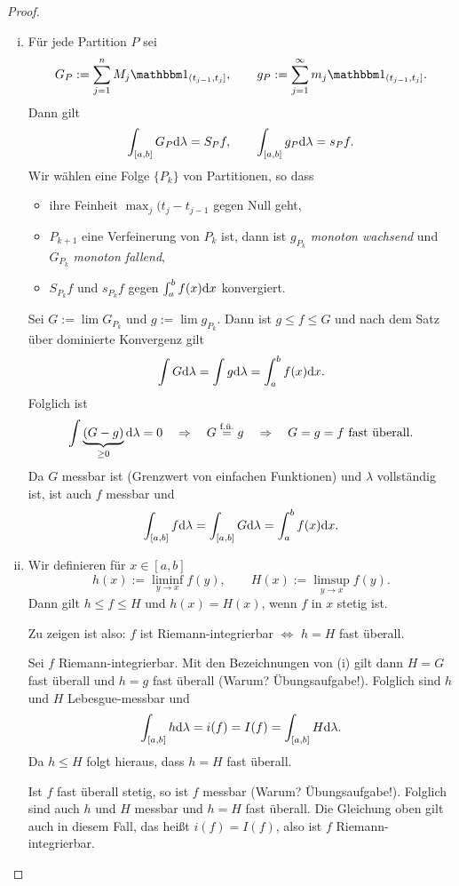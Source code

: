 \begin{proof}
 \begin{enumerate}[(i)]
  \item Für jede Partition $P$ sei
  \[ G_P := \sum_{j=1}^n M_j \ind_{(t_{j-1},t_j]}, \qquad g_P := \sum_{j=1}^\infty m_j \ind_{(t_{j-1},t_j]}. \]
  Dann gilt
  \[ \int_{[a,b]} G_P \mathrm{d} \lambda = S_P f, \qquad \int_{[a,b]} g_P \mathrm{d} \lambda = s_P f. \]
  Wir wählen eine Folge $\{ P_k \}$ von Partitionen, so dass
  \begin{itemize}
   \item ihre Feinheit $\max_j (t_j - t_{j-1}$ gegen Null geht,
   \item $P_{k+1}$ eine Verfeinerung von $P_k$ ist, dann ist $g_{P_k}$ \emph{monoton wachsend} und $G_{P_k}$ \emph{monoton fallend},
   \item $S_{P_k} f$ und $s_{P_k} f$ gegen $\int_a^b f(x) \mathrm{d} x$ konvergiert.
  \end{itemize}
  Sei $G := \lim G_{P_k}$ und $g := \lim g_{P_k}$. Dann ist $g \le f \le G$ und nach dem Satz über dominierte Konvergenz gilt
  \[ \int G \mathrm{d} \lambda = \int g \mathrm{d} \lambda = \int_a^b f(x) \mathrm{d} x. \]
  Folglich ist
  \[ \int \underbrace{(G-g)}_{\ge 0} \mathrm{d} \lambda = 0 \quad \Rightarrow \quad G \overset{\text{f.ü.}}{=} g \quad \Rightarrow \quad G=g=f \text{ fast überall.} \]
  Da $G$ messbar ist (Grenzwert von einfachen Funktionen) und $\lambda$ vollständig ist, ist auch $f$ messbar und
  \[ \int_{[a,b]} f \mathrm{d} \lambda = \int_{[a,b]} G \mathrm{d} \lambda = \int_a^b f(x) \mathrm{d} x. \]
  \item Wir definieren für $x \in [a,b]$
  \[ h(x) := \liminf_{y \to x} f(y), \qquad H(x) := \limsup_{y \to x} f(y). \]
  Dann gilt $h \le f \le H$ und $h(x) = H(x)$, wenn $f$ in $x$ stetig ist.
  
  Zu zeigen ist also: $f$ ist Riemann-integrierbar $\Leftrightarrow$ $h = H$ fast überall.
  
  Sei $f$ Riemann-integrierbar. Mit den Bezeichnungen von (i) gilt dann $H = G$ fast überall und $h=g$ fast überall (Warum? Übungsaufgabe!). Folglich sind $h$ und $H$ Lebesgue-messbar und
  \[ \int_{[a,b]} h \mathrm{d} \lambda = i(f) = I(f) = \int_{[a,b]} H \mathrm{d} \lambda. \]
  Da $h \le H$ folgt hieraus, dass $h = H$ fast überall.
  
  Ist $f$ fast überall stetig, so ist $f$ messbar (Warum? Übungsaufgabe!). Folglich sind auch $h$ und $H$ messbar und $h = H$ fast überall. Die Gleichung oben gilt auch in diesem Fall, das heißt $i(f) = I(f)$, also ist $f$ Riemann-integrierbar. \qedhere
 \end{enumerate}
\end{proof}

